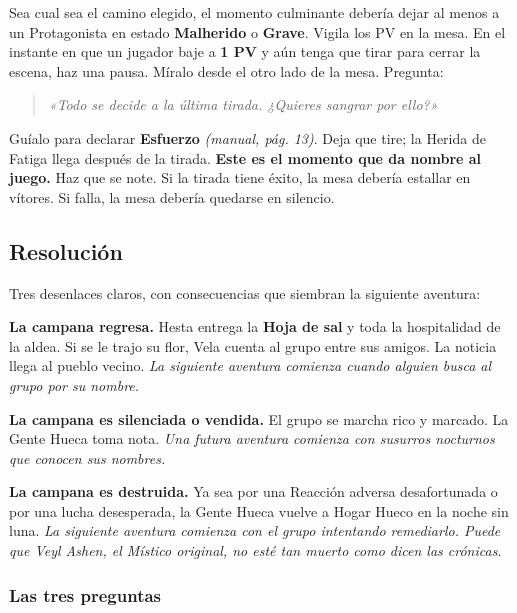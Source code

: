 \documentclass[10pt,a4paper]{article}
\begin{document}
Sea cual sea el camino elegido, el momento culminante debería dejar al menos a un Protagonista en estado \textbf{Malherido} o \textbf{Grave}. Vigila los PV en la mesa. En el instante en que un jugador baje a \textbf{1 PV} y aún tenga que tirar para cerrar la escena, haz una pausa. Míralo desde el otro lado de la mesa. Pregunta:

\begin{quote}
\emph{«Todo se decide a la última tirada. ¿Quieres sangrar por ello?»}
\end{quote}

Guíalo para declarar \textbf{Esfuerzo} \emph{(manual, pág. 13)}. Deja que tire; la Herida de Fatiga llega después de la tirada. \textbf{Este es el momento que da nombre al juego.} Haz que se note. Si la tirada tiene éxito, la mesa debería estallar en vítores. Si falla, la mesa debería quedarse en silencio.

\par\vspace{3pt}

\subsection{Resolución}\label{resoluciuxf3n}

Tres desenlaces claros, con consecuencias que siembran la siguiente aventura:

\textbf{La campana regresa.} Hesta entrega la \textbf{Hoja de sal} y toda la hospitalidad de la aldea. Si se le trajo su flor, Vela cuenta al grupo entre sus amigos. La noticia llega al pueblo vecino. \emph{La siguiente aventura comienza cuando alguien busca al grupo por su nombre.}

\textbf{La campana es silenciada o vendida.} El grupo se marcha rico y marcado. La Gente Hueca toma nota. \emph{Una futura aventura comienza con susurros nocturnos que conocen sus nombres.}

\textbf{La campana es destruida.} Ya sea por una Reacción adversa desafortunada o por una lucha desesperada, la Gente Hueca vuelve a Hogar Hueco en la noche sin luna. \emph{La siguiente aventura comienza con el grupo intentando remediarlo. Puede que Veyl Ashen, el Místico original, no esté tan muerto como dicen las crónicas.}

\subsubsection{Las tres preguntas}\label{las-tres-preguntas}
\end{document}
